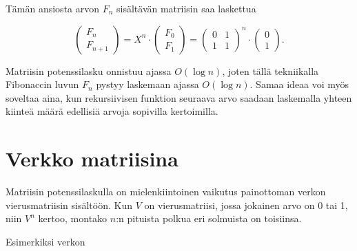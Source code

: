 Tämän ansiosta arvon $F_n$ sisältävän matriisin saa laskettua

\[
\left( \begin{array}{c}
F_n \\
F_{n+1} \end{array} \right)
= X^n\cdot
\left( \begin{array}{c}
F_0 \\
F_1 \end{array} \right)
=
\left( \begin{array}{cc}
0 & 1 \\
1 & 1 \end{array} \right)^n
\cdot
\left( \begin{array}{c}
0 \\
1 \end{array} \right).
\]

Matriisin potenssilasku onnistuu ajassa $O(\log n)$,
joten tällä tekniikalla Fibonaccin luvun $F_n$
pystyy laskemaan ajassa $O(\log n)$.
Samaa ideaa voi myös soveltaa aina,
kun rekursiivisen funktion seuraava arvo
saadaan laskemalla yhteen kiinteä määrä
edellisiä arvoja sopivilla kertoimilla.

\section{Verkko matriisina}

Matriisin potenssilaskulla
on mielenkiintoinen vaikutus
painottoman
verkon vierusmatriisin sisältöön.
Kun $V$ on vierusmatriisi,
jossa jokainen arvo on 0 tai 1,
niin $V^n$ kertoo,
montako $n$:n pituista polkua
eri solmuista on toisiinsa.

Esimerkiksi verkon
\\
\begin{center}
\end{center}

